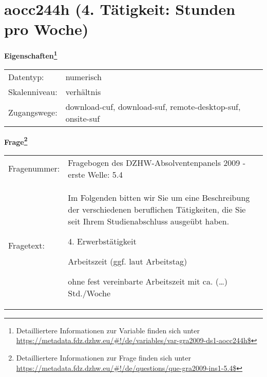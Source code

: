 
    \setcounter{footnote}{0}

    \vspace*{-1.8cm}
	\section{aocc244h (4. Tätigkeit: Stunden pro Woche)}
	\label{section:aocc244h}



    \vspace*{0.5cm}
    \noindent\textbf{Eigenschaften\footnote{Detailliertere Informationen zur Variable finden sich unter
		\url{https://metadata.fdz.dzhw.eu/\#!/de/variables/var-gra2009-ds1-aocc244h$}}}\\
	\begin{tabularx}{\hsize}{@{}lX}
	Datentyp: & numerisch \\
	Skalenniveau: & verhältnis \\
	Zugangswege: &
	  download-cuf, 
	  download-suf, 
	  remote-desktop-suf, 
	  onsite-suf
 \\
    \end{tabularx}



				\vspace*{0.5cm}
                \noindent\textbf{Frage\footnote{Detailliertere Informationen zur Frage finden sich unter
		              \url{https://metadata.fdz.dzhw.eu/\#!/de/questions/que-gra2009-ins1-5.4$}}}\\
				\begin{tabularx}{\hsize}{@{}lX}
					Fragenummer: &
					  Fragebogen des DZHW-Absolventenpanels 2009 - erste Welle:
					  5.4
 \\
					Fragetext: & Im Folgenden bitten wir Sie um eine Beschreibung der verschiedenen beruflichen Tätigkeiten, die Sie seit Ihrem Studienabschluss ausgeübt haben.\par  4. Erwerbstätigkeit\par  Arbeitszeit (ggf. laut Arbeitstag)\par  ohne fest vereinbarte Arbeitszeit mit ca. (…) Std./Woche \\
				\end{tabularx}





